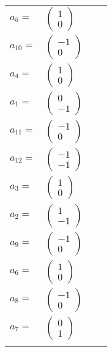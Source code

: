 \documentclass[1p]{elsarticle_modified}
\theoremstyle{definition}
\begin{document}
\begin{tabular}{m{7pt} m{180pt} m{7pt} m{180pt} }
\flushright $a_{5}=$&$\begin{pmatrix}1\\0\end{pmatrix}$ \\
\flushright $a_{10}=$&$\begin{pmatrix}-1\\0\end{pmatrix}$ \\
\flushright $a_{4}=$&$\begin{pmatrix}1\\0\end{pmatrix}$ \\
\flushright $a_{1}=$&$\begin{pmatrix}0\\-1\end{pmatrix}$ \\
\flushright $a_{11}=$&$\begin{pmatrix}-1\\0\end{pmatrix}$ \\
\flushright $a_{12}=$&$\begin{pmatrix}-1\\-1\end{pmatrix}$ \\
\flushright $a_{3}=$&$\begin{pmatrix}1\\0\end{pmatrix}$ \\
\flushright $a_{2}=$&$\begin{pmatrix}1\\-1\end{pmatrix}$ \\
\flushright $a_{9}=$&$\begin{pmatrix}-1\\0\end{pmatrix}$ \\
\flushright $a_{6}=$&$\begin{pmatrix}1\\0\end{pmatrix}$ \\
\flushright $a_{8}=$&$\begin{pmatrix}-1\\0\end{pmatrix}$ \\
\flushright $a_{7}=$&$\begin{pmatrix}0\\1\end{pmatrix}$\\&\end{tabular}
\end{document}
